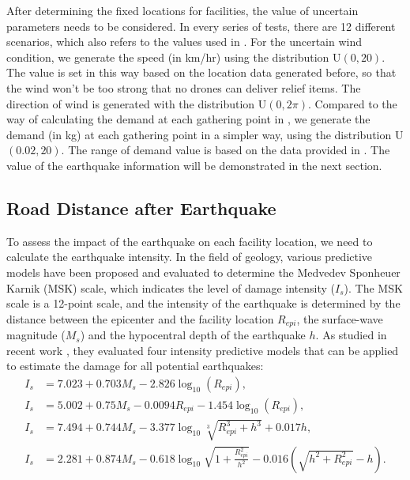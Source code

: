 \documentclass[preprint,review,11pt,authoryear]{elsarticle}
\begin{document}
After determining the fixed locations for facilities, the value of uncertain parameters needs to be considered. In every series of tests, there are 12 different scenarios, which also refers to the values used in \cite{dukkanci2023drones}. For the uncertain wind condition, we generate the speed (in km/hr) using the distribution U$(0,20)$. The value is set in this way based on the location data generated before, so that the wind won't be too strong that no drones can deliver relief items. The direction of wind is generated with the distribution U$(0,2\pi)$. Compared to the way of calculating the demand at each gathering point in \cite{dukkanci2023drones}, we generate the demand (in kg) at each gathering point in a simpler way, using the distribution U$(0.02,20)$. The range of demand value is based on the data provided in \cite{dukkanci2023drones}. The value of the earthquake information will be demonstrated in the next section.

\subsection{Road Distance after Earthquake} \label{subsec:RoadDistance}
To assess the impact of the earthquake on each facility location, we need to calculate the earthquake intensity. In the field of geology, various predictive models have been proposed and evaluated to determine the Medvedev Sponheuer Karnik (MSK) scale, which indicates the level of damage intensity ($I_s$). The MSK scale is a 12-point scale, and the intensity of the earthquake is determined by the distance between the epicenter and the facility location $R_{epi}$, the surface-wave magnitude ($M_s$) and the hypocentral depth of the earthquake $h$. As studied in recent work \cite{erbeyouglu2020earthquake}, they evaluated four intensity predictive models that can be applied to estimate the damage for all potential earthquakes:
\begin{subequations}
    \begin{align}
    I_s &= 7.023 + 0.703 M_s - 2.826  \log_{10}(R_{epi}), \label{eq:MSK_1} \\
    I_s &= 5.002 + 0.75 M_s - 0.0094  R_{epi} - 1.454 \log_{10}(R_{epi}) \label{eq:MSK_2}, \\
    I_s &= 7.494 + 0.744 M_s - 3.377 \log_{10} \sqrt[3]{R_{epi}^3 + h^3} + 0.017 h \label{eq:MSK_3}, \\
    I_s &= 2.281 + 0.874 M_s - 0.618 \log_{10} \sqrt{1+\frac{R_{epi}^2}{h^2}} - 0.016 \left(\sqrt{h^2 + R_{epi}^2} - h\right) \label{eq:MSK_4}.
    \end{align}
\end{subequations}
\end{document}
